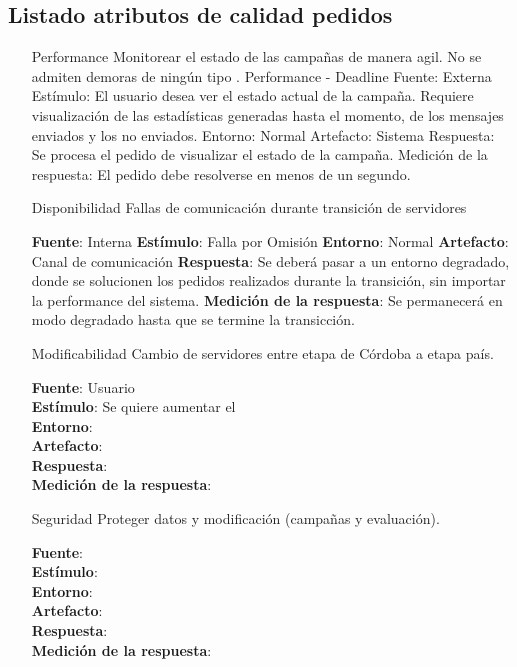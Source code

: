 \documentclass[a4paper, 11pt]{article}
\begin{document}
\subsection{Listado atributos de calidad pedidos}
\begin{itemize}
\item[Performance] Monitorear el estado de las campañas de manera agil. No se admiten demoras de ningún tipo .
Performance - Deadline
Fuente: Externa
Estímulo: El usuario desea ver el estado actual de la campaña. Requiere visualización de las estadísticas generadas hasta el momento, de los mensajes enviados y los no enviados. 
Entorno: Normal
Artefacto: Sistema
Respuesta: Se procesa el pedido de visualizar el estado de la campaña.
Medición de la respuesta: El pedido debe resolverse en menos de un segundo. 

\item[Disponibilidad] Fallas de comunicación durante transición de servidores

\textbf{Fuente}: Interna
\textbf{Estímulo}: Falla por Omisión
\textbf{Entorno}: Normal
\textbf{Artefacto}: Canal de comunicación
\textbf{Respuesta}: Se deberá pasar a un entorno degradado, donde se solucionen los pedidos realizados durante la transición, sin importar la performance del sistema.
\textbf{Medición de la respuesta}:  Se permanecerá en modo degradado hasta que se termine la transicción.

\item[Modificabilidad] Cambio de servidores entre etapa de Córdoba a etapa país.

\textbf{Fuente}: Usuario \\
\textbf{Estímulo}: Se quiere aumentar el \\
\textbf{Entorno}: \\
\textbf{Artefacto}: \\
\textbf{Respuesta}: \\
\textbf{Medición de la respuesta}: \\


\item[Seguridad]Proteger datos y modificación (campañas y evaluación).

\textbf{Fuente}:  \\
\textbf{Estímulo}: \\
\textbf{Entorno}: \\
\textbf{Artefacto}: \\
\textbf{Respuesta}: \\
\textbf{Medición de la respuesta}: \\


\end{itemize}
\end{document}
